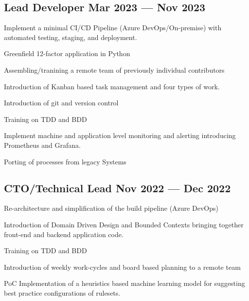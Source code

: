 \subsection{{Lead Developer \hfill Mar 2023 --- Nov 2023}}


\begin{zitemize}
	\item Implement a minimal CI/CD Pipeline (Azure DevOps/On-premise) with automated testing, staging, and deployment.
	\item Greenfield 12-factor application in Python
	\item Assembling/tranining a remote team of previously individual contributors
	\item Introduction of Kanban based task management and four types of work.
	\item Introduction of git and version control
	\item Training on TDD and BDD
	\item Implement machine and application level monitoring and alerting introducing Prometheus and Grafana.
	\item Porting of processes from legacy Systems
\end{zitemize}

\subsection{{CTO/Technical Lead \hfill Nov 2022 --- Dec 2022}}




\begin{zitemize}
	\item Re-architecture and simplification of the build pipeline (Azure DevOps)
	\item Introduction of Domain Driven Design and Bounded Contexts bringing together front-end and backend application code.
	\item Training on TDD and BDD
	\item Introduction of weekly work-cycles and board based planning to a remote team
	\item PoC Implementation of a heuristics based machine learning model for suggesting best practice configurations of rulesets.
\end{zitemize}

